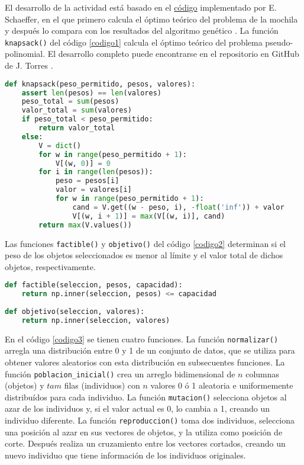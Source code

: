 \documentclass{article}
\begin{document}
El desarrollo de la actividad est\'a basado en el \href{https://github.com/satuelisa/Simulation/blob/master/GeneticAlgorithm/perfGA.py}{c\'odigo} implementado por E. Schaeffer, en el que primero calcula el \'optimo te\'orico del problema de la mochila y despu\'es lo compara con los resultados del algoritmo gen\'etico \cite{elisa1}. La funci\'on \texttt{knapsack()} del c\'odigo \ref{codigo1} calcula el \'optimo te\'orico del problema pseudo-polinomial. El desarrollo completo puede encontrarse en el repositorio en GitHub de J. Torres \cite{jorge1}.

\begin{lstlisting}[caption=Soluci\'on \'Optima, label=codigo1, language=Python]
def knapsack(peso_permitido, pesos, valores):
    assert len(pesos) == len(valores)
    peso_total = sum(pesos)
    valor_total = sum(valores)
    if peso_total < peso_permitido: 
        return valor_total
    else:
        V = dict()
        for w in range(peso_permitido + 1):
            V[(w, 0)] = 0
        for i in range(len(pesos)):
            peso = pesos[i]
            valor = valores[i]
            for w in range(peso_permitido + 1):
                cand = V.get((w - peso, i), -float('inf')) + valor
                V[(w, i + 1)] = max(V[(w, i)], cand)
        return max(V.values())
\end{lstlisting}

Las funciones \texttt{factible()} y \texttt{objetivo()} del c\'odigo \ref{codigo2} determinan si el peso de los objetos seleccionados es menor al l\'imite y el valor total de dichos objetos, respectivamente.

\begin{lstlisting}[caption=Peso y Valor Totales de la Selecci\'on, label=codigo2, language=Python]
def factible(seleccion, pesos, capacidad):
    return np.inner(seleccion, pesos) <= capacidad
  
def objetivo(seleccion, valores):
    return np.inner(seleccion, valores)
\end{lstlisting}

En el c\'odigo \ref{codigo3} se tienen cuatro funciones. La funci\'on \texttt{normalizar()} arregla una distribuci\'on entre 0 y 1 de un conjunto de datos, que se utiliza para obtener valores aleatorios con esta distribuci\'on en subsecuentes funciones. La funci\'on \texttt{poblacion\_inicial()} crea un arreglo bidimensional de $n$ columnas (objetos) y $tam$ filas (individuos) con $n$ valores 0 \'o 1 aleatoria e uniformemente distribu\'idos para cada individuo. La funci\'on \texttt{mutacion()} selecciona objetos al azar de los individuos y, si el valor actual es 0, lo cambia a 1, creando un individuo diferente. La funci\'on \texttt{reproduccion()} toma dos individuos, selecciona una posici\'on al azar en sus vectores de objetos, y la utiliza como posici\'on de corte. Despu\'es realiza un cruzamiento entre los vectores cortados, creando un nuevo individuo que tiene informaci\'on de los individuos originales.
\end{document}
